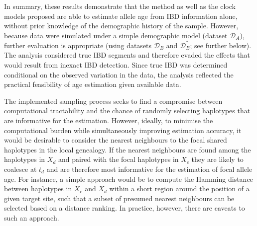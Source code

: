 
In summary, these results demonstrate that the method as well as the clock models proposed are able to estimate allele age from IBD information alone, without prior knowledge of the demographic history of the sample.
However, because data were simulated under a simple demographic model (dataset $\mathcal{D}_A$), further evaluation is appropriate (\eg using datasets $\mathcal{D}_B$ and $\mathcal{D}_B^{\ast}$; see further below).
The analysis considered true IBD segments and therefore evaded the effects that would result from inexact IBD detection.
Since true IBD was determined conditional on the observed variation in the data, the analysis reflected the practical feasibility of age estimation given available data.


The implemented sampling process seeks to find a compromise between computational tractability and the chance of randomly selecting haplotypes that are informative for the estimation.
However, ideally, to minimise the computational burden while simultaneously improving estimation accuracy, it would be desirable to consider the nearest neighbours to the focal shared haplotypes in the local genealogy.
If the nearest neighbours are found among the haplotypes in $X_d$ and paired with the focal haplotypes in $X_c$ they are likely to coalesce at $t_d$ and are therefore most informative for the estimation of focal allele age.
For instance, a simple approach would be to compute the Hamming distance between haplotypes in $X_c$ and $X_d$ within a short region around the position of a given target site, such that a subset of presumed nearest neighbours can be selected based on a distance ranking.
In practice, however, there are  caveats to such an approach.

